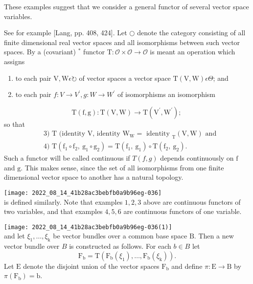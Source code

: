 \documentclass[10pt]{article}
\begin{document}
These examples suggest that we consider a general functor of several vector space variables.

See for example [Lang, pp. 408, 424]. Let $\bigcirc$ denote the category consisting of all finite dimensional real vector spaces and all isomorphisms between such vector spaces. By a (covariant) ${ }^{*}$ functor $\mathrm{T}: \mathcal{O} \times \mathcal{O} \rightarrow \mathcal{O}$ is meant an operation which assigns

\begin{enumerate}
  \item to each pair $\mathrm{V}, \mathrm{W} \epsilon \circlearrowright$ of vector spaces a vector space $\mathrm{T}(\mathrm{V}, \mathrm{W}) \epsilon \Theta$; and

  \item to each pair $f: V \rightarrow V^{\prime}, g: W \rightarrow W^{\prime}$ of isomorphisms an isomorphism

\end{enumerate}
$$
\mathrm{T}(\mathrm{f}, \mathrm{g}): \mathrm{T}(\mathrm{V}, \mathrm{W}) \rightarrow \mathrm{T}\left(\mathrm{V}^{\prime}, \mathrm{W}^{\prime}\right) \text {; }
$$
so that
$$
\begin{aligned}
&\text { 3) } \mathrm{T} \text { (identity } \mathrm{V} \text {, identity } \mathrm{W}_{\mathrm{W}}=\text { identity }_{\mathrm{T}}(\mathrm{V}, \mathrm{W}) \text { and } \\
&\text { 4) } \mathrm{T}\left(\mathrm{f}_{1} \circ \mathrm{f}_{2}, \mathrm{~g}_{1} \circ \mathrm{g}_{2}\right)=\mathrm{T}\left(\mathrm{f}_{1}, \mathrm{~g}_{1}\right) \circ \mathrm{T}\left(\mathrm{f}_{2}, \mathrm{~g}_{2}\right) \text {. }
\end{aligned}
$$
Such a functor will be called continuous if $T(f, g)$ depends continuously on $\mathrm{f}$ and $\mathrm{g}$. This makes sense, since the set of all isomorphisms from one finite dimensional vector space to another has a natural topology.

\texttt{[image: 2022\_08\_14\_41b28ac3bebfb0a9b96eg-036]}\\
is defined similarly. Note that examples $1,2,3$ above are continuous functors of two variables, and that examples $4,5,6$ are continuous functors of one variable.

\texttt{[image: 2022\_08\_14\_41b28ac3bebfb0a9b96eg-036(1)]}\\
and let $\xi_{1}, \ldots, \xi_{\mathrm{k}}$ be vector bundles over a common base space $\mathrm{B}$. Then a new vector bundle over $B$ is constructed as follows. For each $b \in B$ let
$$
\mathrm{F}_{\mathrm{b}}=\mathrm{T}\left(\mathrm{F}_{\mathrm{b}}\left(\xi_{1}\right), \ldots, \mathrm{F}_{\mathrm{b}}\left(\xi_{\mathrm{k}}\right)\right) .
$$
Let $\mathrm{E}$ denote the disjoint union of the vector spaces $\mathrm{F}_{\mathrm{b}}$ and define $\pi: \mathrm{E} \rightarrow \mathrm{B}$ by $\pi\left(\mathrm{F}_{\mathrm{b}}\right)=\mathrm{b}$.
\end{document}

